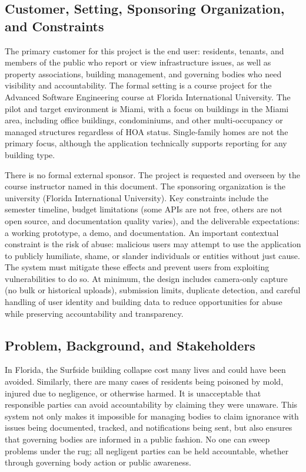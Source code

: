 \documentclass[12pt]{article}
\begin{document}
\subsection{Customer, Setting, Sponsoring Organization, and Constraints}

The primary customer for this project is the end user: residents, tenants, and members of the public who report or view infrastructure issues, as well as property associations, building management, and governing bodies who need visibility and accountability. The formal setting is a course project for the Advanced Software Engineering course at Florida International University. The pilot and target environment is Miami, with a focus on buildings in the Miami area, including office buildings, condominiums, and other multi-occupancy or managed structures regardless of HOA status. Single-family homes are not the primary focus, although the application technically supports reporting for any building type.

There is no formal external sponsor. The project is requested and overseen by the course instructor named in this document. The sponsoring organization is the university (Florida International University). Key constraints include the semester timeline, budget limitations (some APIs are not free, others are not open source, and documentation quality varies), and the deliverable expectations: a working prototype, a demo, and documentation. An important contextual constraint is the risk of abuse: malicious users may attempt to use the application to publicly humiliate, shame, or slander individuals or entities without just cause. The system must mitigate these effects and prevent users from exploiting vulnerabilities to do so. At minimum, the design includes camera-only capture (no bulk or historical uploads), submission limits, duplicate detection, and careful handling of user identity and building data to reduce opportunities for abuse while preserving accountability and transparency.

\subsection{Problem, Background, and Stakeholders}

In Florida, the Surfside building collapse cost many lives and could have been avoided. Similarly, there are many cases of residents being poisoned by mold, injured due to negligence, or otherwise harmed. It is unacceptable that responsible parties can avoid accountability by claiming they were unaware. This system not only makes it impossible for managing bodies to claim ignorance with issues being documented, tracked, and notifications being sent, but also ensures that governing bodies are informed in a public fashion. No one can sweep problems under the rug; all negligent parties can be held accountable, whether through governing body action or public awareness.
\end{document}
